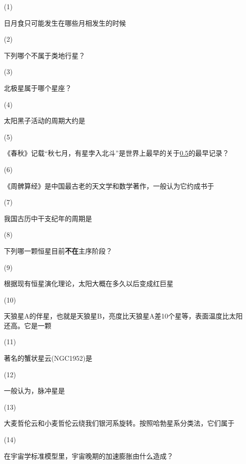 \documentclass[CJK]{article}
\begin{document}
\bitem
\item[(1)]{日月食只可能发生在哪些月相发生的时候

}    
\item[(2)]{下列哪个不属于类地行星？
  
}
\item[(3)]{北极星属于哪个星座？

}
\item[(4)]{太阳黑子活动的周期大约是
  
}
\item[(5)]{《春秋》记载“秋七月，有星孛入北斗”是世界上最早的关于\uline{0.5}的最早记录？

}  
\item[(6)]{《周髀算经》是中国最古老的天文学和数学著作，一般认为它约成书于

}
\item[(7)]{我国古历中干支纪年的周期是

}
\item[(8)]{下列哪一颗恒星目前{\bf 不在}主序阶段？

}    
\item[(9)]{根据现有恒星演化理论，太阳大概在多久以后变成红巨星

}  
\item[(10)]{天狼星A的伴星，也就是天狼星B，亮度比天狼星A差10个星等，表面温度比太阳还高。它是一颗

}
\item[(11)]{著名的蟹状星云(NGC1952)是

}  
\item[(12)]{一般认为，脉冲星是

}
\item[(13)]{大麦哲伦云和小麦哲伦云绕我们银河系旋转。按照哈勃星系分类法，它们属于

}  
\item[(14)]{在宇宙学标准模型里，宇宙晚期的加速膨胀由什么造成？

}  
\end{document}
